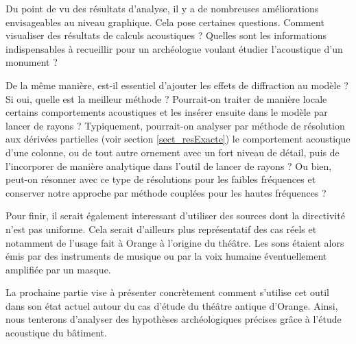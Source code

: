 Du point de vu des résultats d'analyse, il y a de nombreuses améliorations envisageables au niveau graphique. Cela pose certaines questions. Comment visualiser des résultats de calculs acoustiques ? Quelles sont les informations indispensables à recueillir pour un archéologue voulant étudier l'acoustique d'un monument ? 

De la même manière, est-il essentiel d'ajouter les effets de diffraction au modèle ? Si oui, quelle est la meilleur méthode ? Pourrait-on traiter de manière locale certains comportements acoustiques et les insérer ensuite dans le modèle par lancer de rayons ? Typiquement, pourrait-on analyser par méthode de résolution aux dérivées partielles (voir section \ref{sect_resExacte}) le comportement acoustique d'une colonne, ou de tout autre ornement avec un fort niveau de détail, puis de l'incorporer de manière analytique dans l'outil de lancer de rayons ? Ou bien, peut-on résonner avec ce type de résolutions pour les faibles fréquences et conserver notre approche par méthode couplées pour les hautes fréquences ?

Pour finir, il serait également interessant d'utiliser des sources dont la directivité n'est pas uniforme. Cela serait d'ailleurs plus représentatif des cas réels et notamment de l'usage fait à Orange à l'origine du théâtre. Les sons étaient alors émis par des instruments de musique ou par la voix humaine éventuellement amplifiée par un masque.

 La prochaine partie vise à présenter concrètement comment s'utilise cet outil dans son état actuel autour du cas d'étude du théâtre antique d'Orange. Ainsi, nous tenterons d'analyser des hypothèses archéologiques précises grâce à l'étude acoustique du bâtiment.




\newpage
	
 
 
